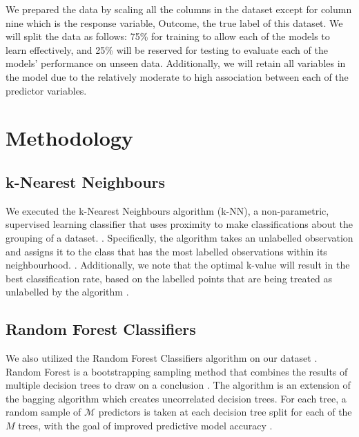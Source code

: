 \documentclass[12pt]{article}
\begin{document}
\begin{indent}
\onehalfspacing
	
We prepared the data by scaling all the columns in the dataset except for column nine which is the response variable, Outcome, the true label of this dataset. We will split the data as follows: 75\% for training to allow each of the models to learn effectively, and 25\% will be reserved for testing to evaluate each of the models' performance on unseen data. Additionally, we will retain all variables in the model due to the relatively moderate to high association between each of the predictor variables.


\end{indent}

\section{Methodology}
 
\subsection{k-Nearest Neighbours}

\indent
\onehalfspacing

We executed the k-Nearest Neighbours algorithm (k-NN), a non-parametric, supervised learning classifier that uses proximity to make classifications about the grouping of a dataset. \citep{peterson2009k,7724478}. Specifically, the algorithm takes an unlabelled observation and assigns it to the class that has the most labelled observations within its neighbourhood. \citep{Lecture14}. Additionally, we note that the optimal k-value will result in the best classification rate, based on the labelled points that are being treated as unlabelled by the algorithm \citep{Lecture14}.

 \subsection{Random Forest Classifiers}
 
\indent
\onehalfspacing

We also utilized the Random Forest Classifiers algorithm on our dataset \citep{zhou2012ensemble}. Random Forest is a bootstrapping sampling method that combines the results of multiple decision trees to draw on a conclusion \citep{7724478}. The algorithm is an extension of the bagging algorithm which creates uncorrelated decision trees. For each tree, a random sample of $\mathcal{M}$ predictors is taken at each decision tree split for each of the $M$ trees, with the goal of improved predictive model accuracy \citep{Lecture16}.
\end{document}

